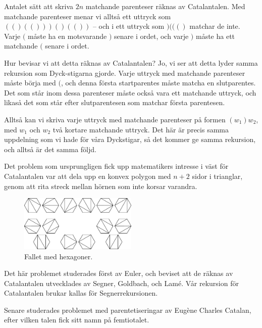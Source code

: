 \documentclass{tufte-handout}
\begin{document}
\begin{example}
    Antalet sätt att skriva $2n$ matchande parenteser räknas av Catalantalen. Med matchande parenteser menar vi alltså ett uttryck som $(()(()))()(())$ -- och i ett uttryck som $)((()$ matchar de inte. Varje $($ måste ha en motsvarande $)$ senare i ordet, och varje $)$ måste ha ett matchande $($ senare i ordet.

    Hur bevisar vi att detta räknas av Catalantalen? Jo, vi ser att detta lyder samma rekursion som Dyck-stigarna gjorde. Varje uttryck med matchande parenteser måste börja med $($, och denna första startparentes måste matcha en slutparentes. Det som står inom dessa parenteser måste också vara ett matchande uttryck, och likaså det som står efter slutparentesen som matchar första parentesen.

    Alltså kan vi skriva varje uttryck med matchande parenteser på formen $(w_1)w_2$, med $w_1$ och $w_2$ två kortare matchande uttryck. Det här är precis samma uppdelning som vi hade för våra Dyckstigar, så det kommer ge samma rekursion, och alltså är det samma följd.
\end{example}

\begin{example}\label{example_polygons}
    Det problem som ursprungligen fick upp matematikers intresse i väst för Catalantalen var att dela upp en konvex polygon med $n+2$ sidor i trianglar, genom att rita streck mellan hörnen som inte korsar varandra.

    \begin{figure}
        \centering
        \includegraphics[width = 0.5\textwidth]{graphics/Catalan-Hexagons-example.pdf}
        \caption{Fallet med hexagoner.}
    \end{figure}

    Det här problemet studerades först av Euler, och beviset att de räknas av Catalantalen utvecklades av Segner, Goldbach, och Lamé. Vår rekursion för Catalantalen brukar kallas för Segnerrekursionen.

    Senare studerades problemet med parentetiseringar av Eugène Charles Catalan, efter vilken talen fick sitt namn på femtiotalet.
\end{example}
\end{document}
